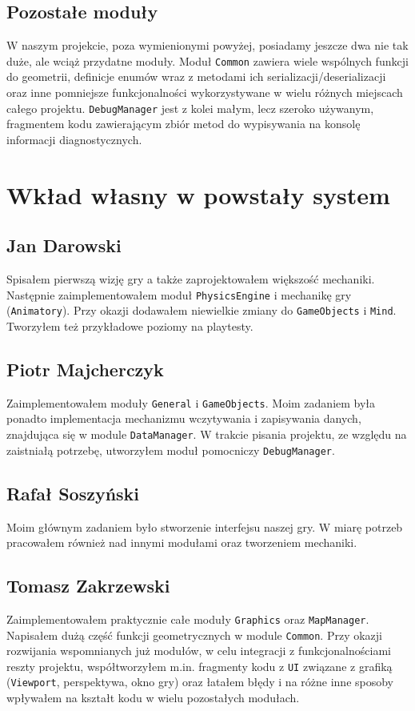 \documentclass[licencjacka]{pracamgr}
\begin{document}
  \section{Pozostałe moduły}
    W naszym projekcie, poza wymienionymi powyżej, posiadamy jeszcze dwa nie tak duże, ale wciąż przydatne moduły. Moduł
    \texttt{Common} zawiera wiele wspólnych funkcji do geometrii, definicje enumów wraz z metodami ich
    serializacji/deserializacji oraz inne pomniejsze funkcjonalności wykorzystywane w wielu różnych miejscach całego
    projektu. \texttt{DebugManager} jest z kolei małym, lecz szeroko używanym, fragmentem kodu zawierającym zbiór metod
    do wypisywania na konsolę informacji diagnostycznych.


\chapter{Wkład własny w powstały system}

  \section{Jan Darowski}
  Spisałem pierwszą wizję gry a także zaprojektowałem większość mechaniki. Następnie zaimplementowałem moduł \texttt{PhysicsEngine} i
  mechanikę gry (\texttt{Animatory}). Przy okazji dodawałem niewielkie zmiany do \texttt{GameObjects} i \texttt{Mind}. Tworzyłem też
  przykładowe poziomy na playtesty.

  \section{Piotr Majcherczyk}
  Zaimplementowałem moduły \texttt{General} i \texttt{GameObjects}. Moim zadaniem była ponadto implementacja
  mechanizmu wczytywania i zapisywania danych, znajdująca się w module \texttt{DataManager}. W trakcie pisania
  projektu, ze względu na zaistniałą potrzebę, utworzyłem moduł pomocniczy \texttt{DebugManager}.

  \section{Rafał Soszyński}
  Moim głównym zadaniem było stworzenie interfejsu naszej gry. W miarę potrzeb pracowałem również nad innymi modułami
  oraz tworzeniem mechaniki.

  \section{Tomasz Zakrzewski}
  Zaimplementowałem praktycznie całe moduły \texttt{Graphics} oraz \texttt{MapManager}. Napisałem dużą część funkcji
  geometrycznych w module \texttt{Common}. Przy okazji rozwijania wspomnianych już modułów, w celu integracji z
  funkcjonalnościami reszty projektu, współtworzyłem m.in. fragmenty kodu z \texttt{UI} związane z grafiką
  (\texttt{Viewport}, perspektywa, okno gry) oraz łatałem błędy i na różne inne sposoby wpływałem na kształt kodu w
  wielu pozostałych modułach.
\end{document}
